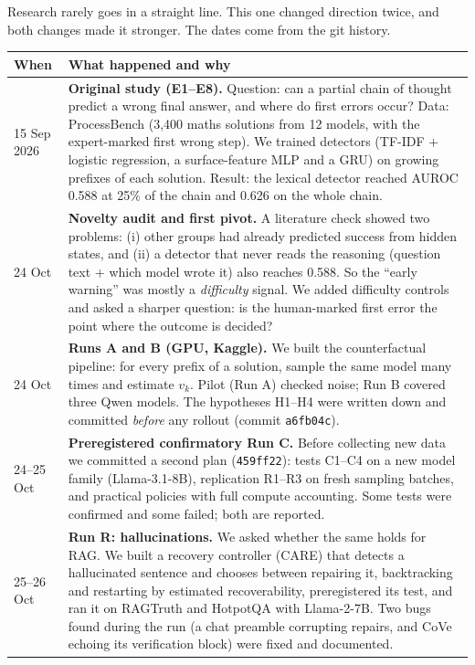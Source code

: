 \documentclass[11pt,a4paper]{article}
\begin{document}
Research rarely goes in a straight line. This one changed direction twice, and both changes made
it stronger. The dates come from the git history.

\begin{longtable}{p{2.1cm}p{13.4cm}}
\toprule
When & What happened and why\\\midrule
15 Sep 2026 & \textbf{Original study (E1--E8).} Question: can a partial chain of thought predict a
wrong final answer, and where do first errors occur? Data: ProcessBench (3,400 maths solutions from
12 models, with the expert-marked first wrong step). We trained detectors (TF-IDF + logistic
regression, a surface-feature MLP and a GRU) on growing prefixes of each solution. Result: the
lexical detector reached AUROC 0.588 at 25\% of the chain and 0.626 on the whole chain.\\
24 Oct & \textbf{Novelty audit and first pivot.} A literature check showed two problems: (i) other
groups had already predicted success from hidden states, and (ii) a detector that never reads the
reasoning (question text + which model wrote it) also reaches 0.588. So the ``early warning'' was
mostly a \emph{difficulty} signal. We added difficulty controls and asked a sharper question:
is the human-marked first error the point where the outcome is decided?\\
24 Oct & \textbf{Runs A and B (GPU, Kaggle).} We built the counterfactual pipeline: for every prefix
of a solution, sample the same model many times and estimate $v_k$. Pilot (Run A) checked noise;
Run B covered three Qwen models. The hypotheses H1--H4 were written down and committed
\emph{before} any rollout (commit \texttt{a6fb04c}).\\
24--25 Oct & \textbf{Preregistered confirmatory Run C.} Before collecting new data we committed a
second plan (\texttt{459ff22}): tests C1--C4 on a new model family (Llama-3.1-8B), replication
R1--R3 on fresh sampling batches, and practical policies with full compute accounting. Some tests
were confirmed and some failed; both are reported.\\
25--26 Oct & \textbf{Run R: hallucinations.} We asked whether the same holds for RAG. We built a
recovery controller (CARE) that detects a hallucinated sentence and chooses between repairing it,
backtracking and restarting by estimated recoverability, preregistered its test, and ran it on
RAGTruth and HotpotQA with Llama-2-7B. Two bugs found during the run (a chat preamble corrupting
repairs, and CoVe echoing its verification block) were fixed and documented.\\

\end{longtable}
\end{document}
